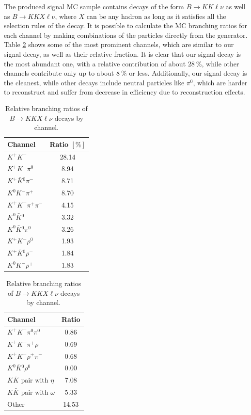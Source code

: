 The produced signal MC sample contains decays of the form $B \to KK\ell \nu$ as well as $B \to KKX\ell \nu$, where $X$ can be any hadron as long as it satisfies all the selection rules of the decay. It is possible to calculate the MC branching ratios for each channel by making combinations of the particles directly from the generator. Table \ref{tab:KKX} shows some of the most prominent channels, which are similar to our signal decay, as well as their relative fraction. It is clear that our signal decay is the most abundant one, with a relative contribution of about $28~\%$, while other channels contribute only up to about $8~\%$ or less. Additionally, our signal decay is the cleanest, while other decays include neutral particles like $\pi^0$, which are harder to reconstruct and suffer from decrease in efficiency due to reconstruction effects.
\begin{table}[H]
	\centering
	\begin{tabular}{|l|c|}
		\hline
		Channel & Ratio $[\%]$ \\
		\hline 
		$K^+ K^-$ & 28.14 \\
		\hline
		$K^+ K^- \pi^0$ & 8.94 \\
		\hline
		$K^+ \bar{K}{}^0 \pi^-$ & 8.71 \\
		\hline
		$K^0 K^- \pi^+$ & 8.70 \\
		\hline
		$K^+ K^- \pi^+ \pi^-$ & 4.15 \\
		\hline
		$K^0 \bar K {}^0$ & 3.32 \\
		\hline
		$K^0 \bar K {}^0 \pi^0$ & 3.26 \\
		\hline
		$K^+ K^- \rho^0$ & 1.93 \\
		\hline
		$K^+ \bar{K}{}^0 \rho^-$ & 1.84 \\
		\hline
		$K^0 K^- \rho^+$ & 1.83 \\
		\hline
	\end{tabular}
	\begin{tabular}{|l|c|}
		\hline
		Channel & Ratio \\
		\hline 
		$K^+ K^- \pi^0 \pi^0$ & 0.86 \\
		\hline
		$K^+ K^- \pi^+ \rho^-$ & 0.69 \\
		\hline
		$K^+ K^- \rho^+ \pi^-$ & 0.68 \\
		\hline
		$K^0 \bar K {}^0 \rho^0$ & 0.00 \\
		\hline
		\hline
		$K \bar K$ pair with $\eta$ & 7.08 \\
		\hline
		$K \bar K$ pair with $\omega$ & 5.33 \\
		\hline
		Other & 14.53 \\
		\hline
	\end{tabular}
	\captionsetup{width=.8\linewidth}
	\caption{Relative branching ratios of $B \to KKX\ell \nu$ decays by channel.}
	\label{tab:KKX}
\end{table}

